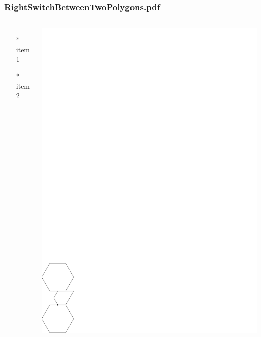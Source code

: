 \begin{frame} \frametitle{RightSwitchBetweenTwoPolygons.pdf}
    \begin{columns}[c]
        \begin{itemize}
            \item[*] item 1
            \item[*] item 2
        \end{itemize}
        \begin{minipage}{\linewidth}
            \begin{center}
            \includegraphics[width=.9\textwidth]{graphics/RightSwitchBetweenTwoPolygons.pdf}
            \label{gfx:RightSwitchBetweenTwoPolygons.pdf}
            \end{center}
        \end{minipage}
    \end{columns}
\end{frame}
